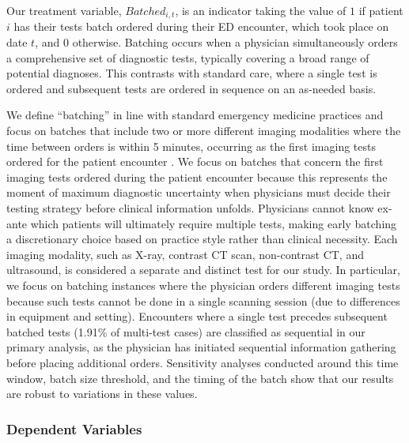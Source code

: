 \documentclass[,,nonblindrev]{informs}
\begin{document}
Our treatment variable, \(Batched_{i,t}\), is an indicator taking the
value of \(1\) if patient \(i\) has their tests batch ordered during
their ED encounter, which took place on date \(t\), and \(0\) otherwise.
Batching occurs when a physician simultaneously orders a comprehensive
set of diagnostic tests, typically covering a broad range of potential
diagnoses. This contrasts with standard care, where a single test is
ordered and subsequent tests are ordered in sequence on an as-needed
basis.

We define ``batching'' in line with standard emergency medicine
practices and focus on batches that include two or more different
imaging modalities where the time between orders is within 5 minutes,
occurring as the first imaging tests ordered for the patient encounter
\citep[\citet{jameson2024variation}]{su2025crisis}. We focus on batches
that concern the first imaging tests ordered during the patient
encounter because this represents the moment of maximum diagnostic
uncertainty when physicians must decide their testing strategy before
clinical information unfolds. Physicians cannot know ex-ante which
patients will ultimately require multiple tests, making early batching a
discretionary choice based on practice style rather than clinical
necessity. Each imaging modality, such as X-ray, contrast CT scan,
non-contrast CT, and ultrasound, is considered a separate and distinct
test for our study. In particular, we focus on batching instances where
the physician orders different imaging tests because such tests cannot
be done in a single scanning session (due to differences in equipment
and setting). Encounters where a single test precedes subsequent batched
tests (1.91\% of multi-test cases) are classified as sequential in our
primary analysis, as the physician has initiated sequential information
gathering before placing additional orders. Sensitivity analyses
conducted around this time window, batch size threshold, and the timing
of the batch show that our results are robust to variations in these
values.

\subsubsection{Dependent Variables}\label{dependent-variables}
\end{document}

